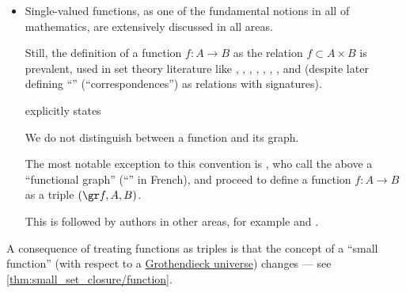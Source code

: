 \begin{remark}
\begin{itemize}
    \item Single-valued functions, as one of the fundamental notions in all of mathematics, are extensively discussed in all areas.

    Still, the definition of a function \( f: A \to B \) as the relation \( f \subset A \times B \) is prevalent, used in set theory literature like
    \cite[def. I.6.3]{Kunen2013SetTheory},
    \cite[11]{Jech2006SetTheory},
    \cite[43]{Enderton1977SetTheory},
    \cite[30]{Halmos1960NaiveSetTheory},
    \cite[def. 6.2.8]{Hinman2005Logic},
    \cite[xxi]{Mendelson2015Logic},
    \cite[143]{КолмогоровДрагалин2006ЛогикаДополнительныеГлавы},
    \cite[127]{Герасимов2014Вычислимость} and
    \cite[\S 1.2.4]{КусраевКутателадзе2005БулевозначныйАнализ} (despite later defining \enquote{} (\enquote{correspondences}) as relations with signatures).

    \Textcite[26]{Kelley1975GeneralTopology} explicitly states
    \begin{displayquote}
      We do not distinguish between a function and its graph.
    \end{displayquote}

    The most notable exception to this convention is \cite[def. II.3.4]{Bourbaki2004TheoryOfSets}, who call the above a \enquote{functional graph} (\enquote{} in French), and proceed to define a function \( f: A \to B \) as a triple \( (\gr f, A, B) \).

    This is followed by authors in other areas, for example
    \cite[2]{Harzheim2005OrderedSets} and
    \cite[14]{AdámekHerrlichStrecker2004JoyOfCats}.
  \end{itemize}
\end{remark}
\begin{comments}
  \item A consequence of treating functions as triples is that the concept of a \enquote{small function} (with respect to a \hyperref[def:grothendieck_universe]{Grothendieck universe}) changes --- see \cref{thm:small_set_closure/function}.
\end{comments}

